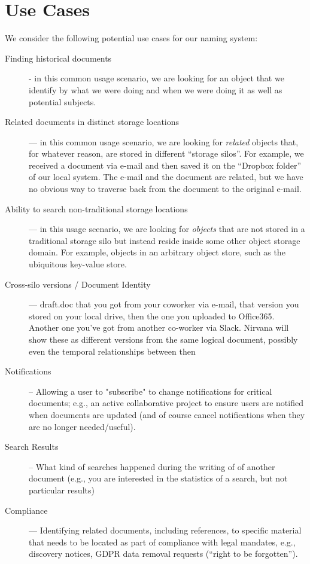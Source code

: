 \section{Use Cases}

We consider the following potential use cases for our naming system:

\begin{description}

    \item[Finding historical documents] - in this common usage scenario, we are
    looking for an object that we identify by what we were doing and when we
    were doing it as well as potential subjects.

    \item[Related documents in distinct storage locations] --- in this common
    usage scenario, we are looking for \textit{related} objects that, for
    whatever reason, are stored in different ``storage silos''.  For example, we
    received a document via e-mail and then saved it on the ``Dropbox folder''
    of our local system.  The e-mail and the document are related, but we have
    no obvious way to traverse back from the document to the original e-mail.

    \item[Ability to search non-traditional storage locations] --- in this usage
    scenario, we are looking for \textit{objects} that are not stored in a
    traditional storage silo but instead reside inside some other object storage
    domain.  For example, objects in an arbitrary object store, such as the
    ubiquitous key-value store.

    \item[Cross-silo versions / Document Identity]  ---
    draft.doc that you got from your coworker via e-mail, that version you stored
    on your local drive, then the one you uploaded to Office365. Another one you've
    got from another co-worker via Slack. Nirvana will show these as different
    versions from the same logical document, possibly even the temporal relationships
    between then

    \item[Notifications] -- Allowing a user to "subscribe" to change
    notifications for critical documents; e.g., an active collaborative project
    to ensure users are notified when documents are updated (and of course
    cancel notifications when they are no longer needed/useful).

    \item[Search Results] -- What kind of searches happened during the writing
    of of another document (e.g., you are interested in the statistics of a
    search, but not particular results)

    \item[Compliance] --- Identifying related documents, including references,
    to specific material that needs to be located as part of compliance with
    legal mandates, e.g., discovery notices, GDPR data removal requests (``right
    to be forgotten'').
\end{description}


